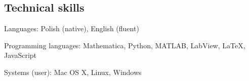 \documentclass[margin,line]{resume}
\begin{document}
\begin{resume}
    \section{\mysidestyle Technical skills}
    \begin{list2}
        \item Languages: Polish (native), English (fluent)
        \item Programming languages: Mathematica, Python, MATLAB, LabView, LaTeX, JavaScript
        \item Systems (user): Mac OS X, Linux, Windows
    \end{list2}

\newpage


\end{resume}
\end{document}
